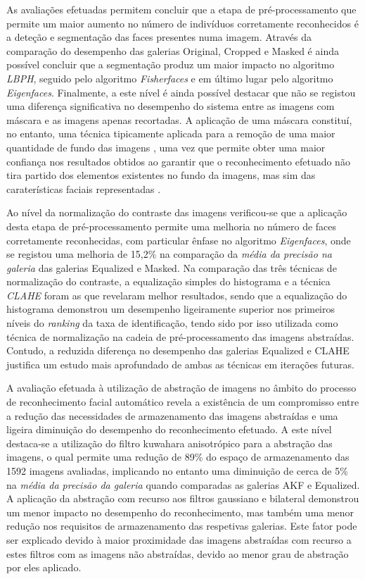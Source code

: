 As avaliações efetuadas permitem concluir que a etapa de pré-processamento que permite um maior aumento no número de indivíduos corretamente reconhecidos é a deteção e segmentação das faces presentes numa imagem. Através da comparação do desempenho das galerias Original, Cropped e Masked é ainda possível concluir que a segmentação produz um maior impacto no algoritmo \textit{LBPH}, seguido pelo algoritmo \textit{Fisherfaces} e em último lugar pelo algoritmo \textit{Eigenfaces}. Finalmente, a este nível é ainda possível destacar que não se registou uma diferença significativa no desempenho do sistema entre as imagens com máscara e as imagens apenas recortadas. A aplicação de uma máscara constituí, no entanto, uma técnica tipicamente aplicada para a remoção de uma maior quantidade de fundo das imagens \cite{Phillips2000, ahonen2004face, Kumar2009}, uma vez que permite obter uma maior confiança nos resultados obtidos ao garantir que o reconhecimento efetuado não tira partido dos elementos existentes no fundo da imagens, mas sim das caraterísticas faciais representadas \cite{Kumar2009}.

Ao nível da normalização do contraste das imagens verificou-se que a aplicação desta etapa de pré-processamento permite uma melhoria no número de faces corretamente reconhecidas, com particular ênfase no algoritmo \textit{Eigenfaces}, onde se registou uma melhoria de 15,2\% na comparação da \textit{média da precisão na galeria} das galerias Equalized e Masked. Na comparação das três técnicas de normalização do contraste, a equalização simples do histograma e a técnica \textit{CLAHE} foram as que revelaram melhor resultados, sendo que a equalização do histograma demonstrou um desempenho ligeiramente superior nos primeiros níveis do \textit{ranking} da taxa de identificação, tendo sido por isso utilizada como técnica de normalização na cadeia de pré-processamento das imagens abstraídas. Contudo, a reduzida diferença no desempenho das galerias Equalized e CLAHE justifica um estudo mais aprofundado de ambas as técnicas em iterações futuras.

A avaliação efetuada à utilização de abstração de imagens no âmbito do processo de reconhecimento facial automático revela a existência de um compromisso entre a redução das necessidades de armazenamento das imagens abstraídas e uma ligeira diminuição do desempenho do reconhecimento efetuado. A este nível destaca-se a utilização do filtro kuwahara anisotrópico para a abstração das imagens, o qual permite uma redução de 89\% do espaço de armazenamento das 1592 imagens avaliadas, implicando no entanto uma diminuição de cerca de 5\% na \textit{média da precisão da galeria} quando comparadas as galerias AKF e Equalized. A aplicação da abstração com recurso aos filtros gaussiano e bilateral demonstrou um menor impacto no desempenho do reconhecimento, mas também uma menor redução nos requisitos de armazenamento das respetivas galerias. Este fator pode ser explicado devido à maior proximidade das imagens abstraídas com recurso a estes filtros com as imagens não abstraídas, devido ao menor grau de abstração por eles aplicado.

